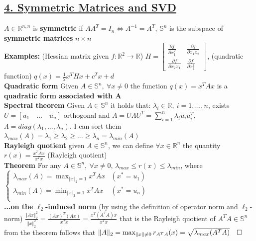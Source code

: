 \documentclass[a4paper]{article}
\begin{document}
\subsection*{\underline{4. Symmetric Matrices and SVD}}
$A\in\mathbb{R}^{n,n}$ is \textbf{symmetric} if $AA^T=I_n \iff A^{-1}=A^T$, $\mathbb{S}^n$ is the subspace of \textbf{symmetric matrices} $n\times{n}$ \\
\textbf{Examples:} (Hessian matrix given $f:\mathbb{R}^2\to\mathbb{R}$) $H=\begin{bmatrix}
    \frac{\partial{f}}{\partial{x_1^2}}&\frac{\partial{f}}{\partial{x_1{x_2}}}\\
    \frac{\partial{f}}{\partial{x_2{x_1}}}&\frac{\partial{f}}{\partial{x_2^2}}
\end{bmatrix}$, (quadratic function) $q(x)=\frac{1}{2}x^T{H}x+c^T{x}+d$\\
\textbf{Quadratic form} Given $A\in\mathbb{S}^n, \ \forall x \ne 0$ the function $q(x)=x^T A x$ is a \textbf{quadratic form associated with A}\\
\textbf{Spectral theorem} Given $A\in\mathbb{S}^n$ it holds that: $\lambda_i\in\mathbb{R}, \ i=1,...,n$, exists $U=[u_1\quad\dots\quad{u_n}]$ orthogonal and $A=U\Lambda{U^T}=\sum_{i=1}^{n}{\lambda_i{u_i}u_i^T}$, $\Lambda=diag(\lambda_1, ..., \lambda_n)$. I can sort them $\lambda_{max}(A)=\lambda_1 \ge \lambda_2 \ge \dots \ge \lambda_n=\lambda_{min}(A)$\\
\textbf{Rayleigh quotient} given $A\in\mathbb{S}^n$, we can define $\forall x \in \mathbb{R}^n$ the quantity $r(x)=\frac{x^T{A}x}{x^T{x}}$ (Rayleigh quotient)\\
\textbf{Theorem} For any $A\in\mathbb{S}^n, \ \forall x \ne 0$, $\lambda_{max} \le r(x) \le \lambda_{min}$, where 
$\begin{cases}
    \lambda_{max}(A)=\max_{\Vert x \Vert_2=1} {x^T A x}&(x^*=u_1)\\
    \lambda_{min}(A)=\min_{\Vert x \Vert_2=1} {x^T A x}&(x^*=u_n)\\
\end{cases}$\\
\textbf{...on the $\ell_2$-induced norm} (by using the definition of operator norm and $\ell_2$-norm) $\frac{\Vert Ax \Vert_2^2}{\Vert x \Vert_2^2}=\frac{(Ax)^T{(Ax)}}{x^T{x}} = \frac{x^T{(A^T{A})x}}{x^T{x}}$ that is the Rayleigh quotient of $A^T{A}\in\mathbb{S}^n$ from the theorem follows that $\Vert A \Vert_2 = \max_{\Vert x \Vert \ne 0} r_{\small A^T A}(x)=\sqrt{\lambda_{max}(A^T A)} \quad \square$ \\
\end{document}
